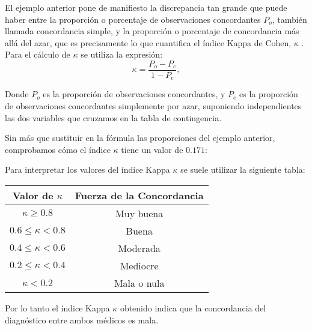 El ejemplo anterior pone de manifiesto la discrepancia tan grande que puede haber entre la proporción o porcentaje de
observaciones concordantes $P_o$, también llamada concordancia simple, y la proporción o porcentaje de concordancia más
allá del azar, que es precisamente lo que cuantifica el índice Kappa de Cohen, $\kappa$ . Para el cálculo de  $\kappa$
se utiliza la expresión: 
\[ 
\kappa  = \frac{P_{o}-P_{e}}{1-P_{e}}, 
\]

Donde $P_{o}$ es la proporción de observaciones concordantes, y $P_{e}$ es la proporción de observaciones concordantes
simplemente por azar, suponiendo independientes las dos variables que cruzamos en la tabla de contingencia.

Sin más que sustituir en la fórmula las proporciones del ejemplo anterior, comprobamos cómo el índice  $\kappa$ tiene un
valor de $0.171$:

Para interpretar los valores del índice Kappa $\kappa$ se suele utilizar la siguiente tabla:

\begin{center}
\begin{tabular}{|c|c|}
\hline
Valor de $\kappa$ & Fuerza de la Concordancia \\
\hline\hline
$\kappa \geq 0.8$ & Muy buena\\
\hline
$0.6\leq\kappa<0.8$ & Buena\\
\hline
$0.4\leq\kappa<0.6$ & Moderada\\
\hline
$0.2\leq\kappa<0.4$ & Mediocre  \\
\hline
$\kappa<0.2$ & Mala o nula  \\
\hline
\end{tabular}
\end{center}

Por lo tanto el índice Kappa $\kappa$ obtenido indica que la concordancia del diagnóstico entre ambos médicos es mala.

